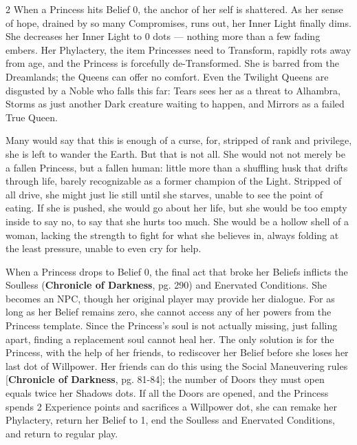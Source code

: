\begin{multicols}{2}
When a Princess hits Belief 0, the anchor of her self is shattered. As her sense of hope, drained by so many Compromises, runs out, her Inner Light finally dims. She decreases her Inner Light to 0 dots — nothing more than a few fading embers. Her Phylactery, the item Princesses need to Transform, rapidly rots away from age, and the Princess is forcefully de-Transformed. She is barred from the Dreamlands; the Queens can offer no comfort. Even the Twilight Queens are disgusted by a Noble who falls this far: Tears sees her as a threat to Alhambra, Storms as just another Dark creature waiting to happen, and Mirrors as a failed True Queen.

Many would say that this is enough of a curse, for, stripped of rank and privilege, she is left to wander the Earth. But that is not all. She would not not merely be a fallen Princess, but a fallen human: little more than a shuffling husk that drifts through life, barely recognizable as a former champion of the Light. Stripped of all drive, she might just lie still until she starves, unable to see the point of eating. If she is pushed, she would go about her life, but she would be too empty inside to say no, to say that she hurts too much. She would be a hollow shell of a woman, lacking the strength to fight for what she believes in, always folding at the least pressure, unable to even cry for help. 

When a Princess drops to Belief 0, the final act that broke her Beliefs inflicts the Soulless (\textbf{Chronicle of Darkness}, pg. 290) and Enervated Conditions. She becomes an NPC, though her original player may provide her dialogue. For as long as her Belief remains zero, she cannot access any of her powers from the Princess template. Since the Princess's soul is not actually missing, just falling apart, finding a replacement soul cannot heal her. The only solution is for the Princess, with the help of her friends, to rediscover her Belief before she loses her last dot of Willpower. Her friends can do this using the Social Maneuvering rules [\textbf{Chronicle of Darkness}, pg. 81-84]; the number of Doors they must open equals twice her Shadows dots. If all the Doors are opened, and the Princess spends 2 Experience points and sacrifices a Willpower dot, she can remake her Phylactery, return her Belief to 1, end the Soulless and Enervated Conditions, and return to regular play. 


\end{multicols}
